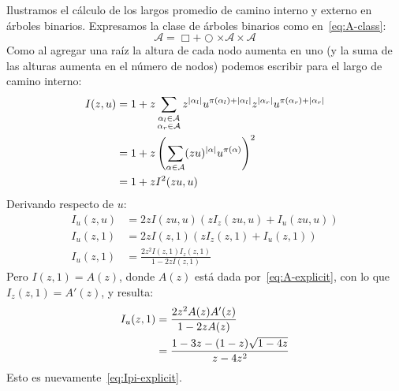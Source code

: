   Ilustramos el cálculo de los largos promedio
  de camino interno y externo en árboles binarios.%
  Expresamos la clase de árboles binarios
  como en~\eqref{eq:A-class}:
  \begin{equation}
    \label{eq:A-class-again}
    \mathcal{A}
      = \Box + \Circle \times \mathcal{A} \times \mathcal{A}
  \end{equation}
  Como al agregar una raíz la altura de cada nodo aumenta en uno
  (y la suma de las alturas aumenta en el número de nodos)
  podemos escribir para el largo de camino interno:
  \begin{align}
    I(z, u)
      &= 1 + z \sum_{\substack{\alpha_l \in \mathcal{A} \\
			       \alpha_r \in \mathcal{A}}}
		 z^{\lvert \alpha_l \rvert}
		   u^{\pi(\alpha_l) + \lvert \alpha_l \rvert}
		 z^{\lvert \alpha_r \rvert}
		   u^{\pi(\alpha_r) + \lvert \alpha_r \rvert}
	   \label{A-bgf-decomposed} \\
      &= 1 + z \left(
		 \sum_{\alpha \in \mathcal{A}}
		   (z u)^{\lvert \alpha \rvert} u^{\pi(\alpha)}
	       \right)^2 \notag \\
      &= 1 + z I^2(z u, u)
	   \label{eq:A-bgf-decomposed-result}
  \end{align}
  Derivando respecto de \(u\):
  \begin{align*}
    I_u(z, u)
      &= 2 z I(z u, u) (z I_z(z u, u) + I_u(z u, u)) \\
    I_u(z, 1)
      &= 2 z I(z, 1) (z I_z(z, 1) + I_u(z, 1)) \\
    I_u(z, 1)
      &= \frac{2 z^2 I(z, 1) I_z(z, 1)}{1 - 2 z I(z, 1)}
  \end{align*}
  Pero \(I(z, 1) = A(z)\),
  donde \(A(z)\) está dada por~\eqref{eq:A-explicit},
  con lo que \(I_z(z, 1) = A'(z)\),
  y resulta:
  \begin{align}
    I_u(z, 1)
      &= \frac{2 z^2 A(z) A'(z)}{1 - 2 z A(z)} \notag \\
      &= \frac{1 - 3 z - (1 - z) \sqrt{1 - 4 z}}{z - 4 z^2}
	   \label{eq:Ipi-bgf_u|u=1}
  \end{align}
  Esto es nuevamente~\eqref{eq:Ipi-explicit}.

